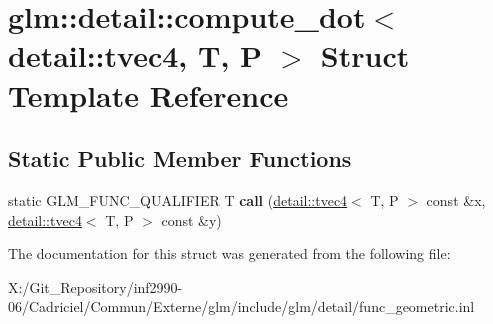\hypertarget{structglm_1_1detail_1_1compute__dot_3_01detail_1_1tvec4_00_01_t_00_01_p_01_4}{\section{glm\-:\-:detail\-:\-:compute\-\_\-dot$<$ detail\-:\-:tvec4, T, P $>$ Struct Template Reference}
\label{structglm_1_1detail_1_1compute__dot_3_01detail_1_1tvec4_00_01_t_00_01_p_01_4}
}
\subsection*{Static Public Member Functions}
\begin{DoxyCompactItemize}
\item 
\hypertarget{structglm_1_1detail_1_1compute__dot_3_01detail_1_1tvec4_00_01_t_00_01_p_01_4_acc311c73135c616fd126c216454759e2}{static G\-L\-M\-\_\-\-F\-U\-N\-C\-\_\-\-Q\-U\-A\-L\-I\-F\-I\-E\-R T {\bfseries call} (\hyperlink{structglm_1_1detail_1_1tvec4}{detail\-::tvec4}$<$ T, P $>$ const \&x, \hyperlink{structglm_1_1detail_1_1tvec4}{detail\-::tvec4}$<$ T, P $>$ const \&y)}\label{structglm_1_1detail_1_1compute__dot_3_01detail_1_1tvec4_00_01_t_00_01_p_01_4_acc311c73135c616fd126c216454759e2}

\end{DoxyCompactItemize}


The documentation for this struct was generated from the following file\-:\begin{DoxyCompactItemize}
\item 
X\-:/\-Git\-\_\-\-Repository/inf2990-\/06/\-Cadriciel/\-Commun/\-Externe/glm/include/glm/detail/func\-\_\-geometric.\-inl\end{DoxyCompactItemize}
